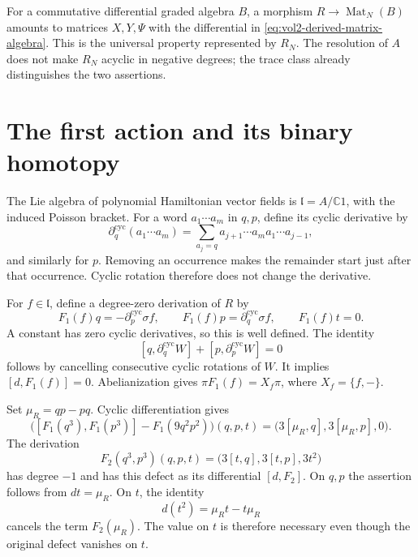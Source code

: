 For a commutative differential graded algebra $B$, a morphism
$R\to\operatorname{Mat}_N(B)$ amounts to matrices $X,Y,\Psi$
with the differential in \eqref{eq:vol2-derived-matrix-algebra}.
This is the universal property represented by $R_N$.
The resolution of $A$ does not make $R_N$ acyclic in negative
degrees; the trace class already distinguishes the two assertions.

\section{The first action and its binary homotopy}
\label{sec:vol2-first-derived-action}

The Lie algebra of polynomial Hamiltonian vector fields is
$\mathfrak l=A/\mathbb C1$, with the induced Poisson bracket.
For a word $a_1\cdots a_m$ in $q,p$, define its cyclic derivative
by
\[
 \partial_q^{\mathrm{cyc}}(a_1\cdots a_m)
 =\sum_{a_j=q}a_{j+1}\cdots a_ma_1\cdots a_{j-1},
\]
and similarly for $p$. Removing an occurrence makes the remainder
start just after that occurrence. Cyclic rotation therefore does not
change the derivative.

For $f\in\mathfrak l$, define a degree-zero derivation of $R$ by
\begin{equation}\label{eq:vol2-hamiltonian-first-lift}
 F_1(f)q=-\partial_p^{\mathrm{cyc}}\sigma f,
 \qquad F_1(f)p=\partial_q^{\mathrm{cyc}}\sigma f,
 \qquad F_1(f)t=0.
\end{equation}
A constant has zero cyclic derivatives, so this is well defined.
The identity
\begin{equation}\label{eq:vol2-cyclic-derivative-identity}
 [q,\partial_q^{\mathrm{cyc}}W]
   +[p,\partial_p^{\mathrm{cyc}}W]=0
\end{equation}
follows by cancelling consecutive cyclic rotations of $W$.
It implies $[d,F_1(f)]=0$. Abelianization gives
$\pi F_1(f)=X_f\pi$, where $X_f=\{f,-\}$.

Set $\mu_R=qp-pq$. Cyclic differentiation gives
\begin{equation}\label{eq:vol2-cubic-vector-defect}
 \bigl([F_1(q^3),F_1(p^3)]-F_1(9q^2p^2)\bigr)(q,p,t)
   =\bigl(3[\mu_R,q],3[\mu_R,p],0\bigr).
\end{equation}
The derivation
\begin{equation}\label{eq:vol2-cubic-word-primitive}
 F_2(q^3,p^3)(q,p,t)
     =\bigl(3[t,q],3[t,p],3t^2\bigr)
\end{equation}
has degree $-1$ and has this defect as its differential
$[d,F_2]$. On $q,p$ the assertion follows from $dt=\mu_R$.
On $t$, the identity
\[
 d(t^2)=\mu_Rt-t\mu_R
\]
cancels the term $F_2(\mu_R)$. The value on $t$ is therefore
necessary even though the original defect vanishes on $t$.

